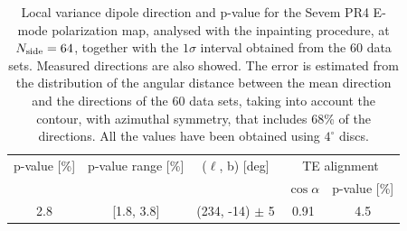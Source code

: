 {\begin{table}[t!]
\centering
\begin{tabular}{ccccc}
\hline
p-value {[}\%{]} & p-value range {[}\%{]} & ($\ell$, b) {[}deg{]} & 
\multicolumn{2}{c}{TE alignment} \\ 
                &                        &                       &      $\cos{\alpha}$ & p-value {[}\%{]} \\ \hline
2.8              & {[}1.8, 3.8{]}         & (234, -14) $\pm$ 5    & 0.91           & 4.5              \\ \hline
\end{tabular}
\caption{Local variance dipole direction and p-value for the Sevem PR4 E-mode polarization map, analysed with the inpainting procedure, at $N_{\rm side} = 64$, together with the $1\sigma$ interval obtained from the 60 data sets.
Measured directions are also showed. The error is estimated from the distribution of the angular distance between the mean direction and the directions of the 60 data sets,
taking into account the contour, with azimuthal symmetry, that includes 68\% of the directions. All the values have been obtained using $4^{\circ}$ discs.}
\label{P_values_PR4}
\end{table}

}
